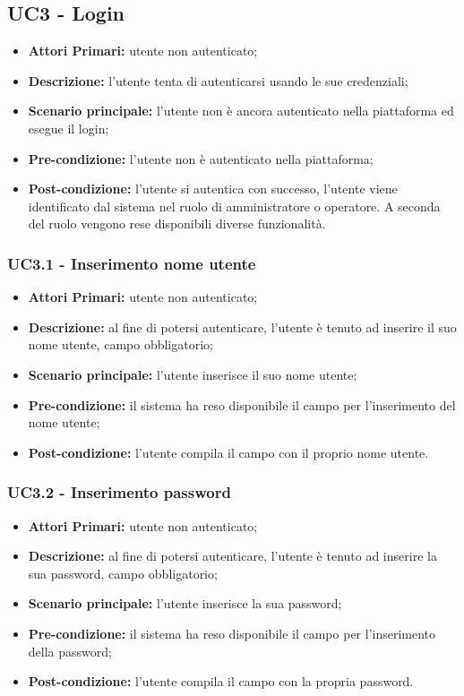 \subsection{UC3 - Login}
\begin{itemize}
	\item \textbf{Attori Primari:} utente non autenticato;
	\item \textbf{Descrizione:} l'utente tenta di autenticarsi usando le sue credenziali;
	\item \textbf{Scenario principale:} l'utente non è ancora autenticato nella piattaforma ed esegue il login;
	\item \textbf{Pre-condizione:} l'utente non è autenticato nella piattaforma;
	\item \textbf{Post-condizione:} l'utente si autentica con successo, l'utente viene identificato dal sistema nel ruolo di amministratore o operatore. A seconda del ruolo vengono rese disponibili diverse funzionalità.
\end{itemize}

\subsubsection{UC3.1 - Inserimento nome utente}
\begin{itemize}
	\item \textbf{Attori Primari:} utente non autenticato;
	\item \textbf{Descrizione:} al fine di potersi autenticare, l'utente è tenuto ad inserire il suo nome utente, campo obbligatorio;
	\item \textbf{Scenario principale:} l'utente inserisce il suo nome utente;
	\item \textbf{Pre-condizione:} il sistema ha reso disponibile il campo per l'inserimento del nome utente;
	\item \textbf{Post-condizione:} l'utente compila il campo con il proprio nome utente.
\end{itemize}	

\subsubsection{UC3.2 - Inserimento password}
\begin{itemize}
	\item \textbf{Attori Primari:} utente non autenticato;
	\item \textbf{Descrizione:} al fine di potersi autenticare, l'utente è tenuto ad inserire la sua password, campo obbligatorio;
	\item \textbf{Scenario principale:} l'utente inserisce la sua password;
	\item \textbf{Pre-condizione:} il sistema ha reso disponibile il campo per l'inserimento della password;
	\item \textbf{Post-condizione:} l'utente compila il campo con la propria password.
\end{itemize}	


